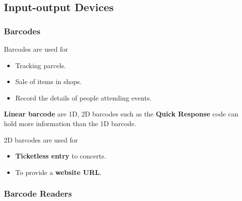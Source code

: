 \subsection{Input-output Devices}

\subsubsection*{Barcodes}

Barcodes are used for
\begin{itemize}
    \item Tracking parcels.
    \item Sale of items in shops.
    \item Record the details of people attending events.
\end{itemize}

\textbf{Linear barcode} are 1D, 2D barcodes such as the \textbf{Quick Response} code can hold more information than the 1D barcode.

2D barcodes are used for
\begin{itemize}
    \item \textbf{Ticketless entry} to concerts.
    \item To provide a \textbf{website URL}.
\end{itemize}

\subsubsection*{Barcode Readers}

